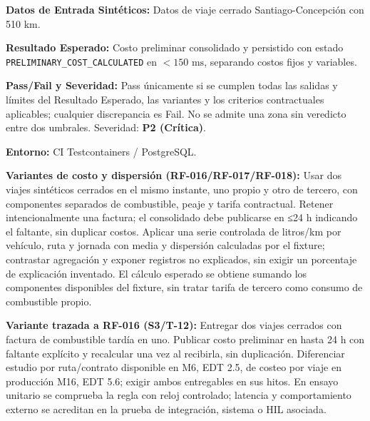 \par\noindent\textbf{Datos de Entrada Sintéticos:} Datos de viaje cerrado Santiago-Concepción con 510 km.\par
\par\noindent\textbf{Resultado Esperado:} Costo preliminar consolidado y persistido con estado \texttt{P\allowbreak{}R\allowbreak{}E\allowbreak{}L\allowbreak{}I\allowbreak{}M\allowbreak{}I\allowbreak{}N\allowbreak{}A\allowbreak{}R\allowbreak{}Y\allowbreak{}\_\allowbreak{}C\allowbreak{}O\allowbreak{}S\allowbreak{}T\allowbreak{}\_\allowbreak{}C\allowbreak{}A\allowbreak{}L\allowbreak{}C\allowbreak{}U\allowbreak{}L\allowbreak{}A\allowbreak{}T\allowbreak{}E\allowbreak{}D\allowbreak{}} en \(< 150\text{ ms}\), separando costos fijos y variables.\par
\par\noindent\textbf{Pass/Fail y Severidad:} Pass únicamente si se cumplen todas las salidas y límites del Resultado Esperado, las variantes y los criterios contractuales aplicables; cualquier discrepancia es Fail. No se admite una zona sin veredicto entre dos umbrales. Severidad: \textbf{P2 (Crítica)}.\par
\par\noindent\textbf{Entorno:} CI Testcontainers / PostgreSQL.\par




\par\noindent\textbf{Variantes de costo y dispersión (RF-016/RF-017/RF-018):} Usar dos viajes sintéticos cerrados en el mismo instante, uno propio y otro de tercero, con componentes separados de combustible, peaje y tarifa contractual. Retener intencionalmente una factura; el consolidado debe publicarse en ≤24 h indicando el faltante, sin duplicar costos. Aplicar una serie controlada de litros/km por vehículo, ruta y jornada con media y dispersión calculadas por el fixture; contrastar agregación y exponer registros no explicados, sin exigir un porcentaje de explicación inventado. El cálculo esperado se obtiene sumando los componentes disponibles del fixture, sin tratar tarifa de tercero como consumo de combustible propio.\par\par





\par\noindent\textbf{Variante trazada a RF-016 (S3/T-12):} Entregar dos viajes cerrados con factura de combustible tardía en uno. Publicar costo preliminar en hasta 24 h con faltante explícito y recalcular una vez al recibirla, sin duplicación. Diferenciar estudio por ruta/contrato disponible en M6, EDT 2.5, de costeo por viaje en producción M16, EDT 5.6; exigir ambos entregables en sus hitos. En ensayo unitario se comprueba la regla con reloj controlado; latencia y comportamiento externo se acreditan en la prueba de integración, sistema o HIL asociada.\par

